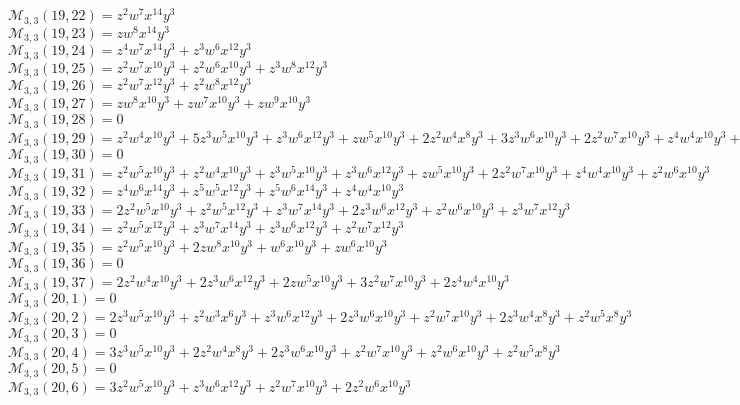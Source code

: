 \documentclass[12pt]{memoireuqam1.3}
\begin{document}
$\mathcal{M}_{3,3}(19,22)=z^2w^7x^{14}y^3$\\
$\mathcal{M}_{3,3}(19,23)=zw^8x^{14}y^3$\\
$\mathcal{M}_{3,3}(19,24)=z^4w^7x^{14}y^3+z^3w^6x^{12}y^3$\\
$\mathcal{M}_{3,3}(19,25)=z^2w^7x^{10}y^3+z^2w^6x^{10}y^3+z^3w^8x^{12}y^3$\\
$\mathcal{M}_{3,3}(19,26)=z^2w^7x^{12}y^3+z^2w^8x^{12}y^3$\\
$\mathcal{M}_{3,3}(19,27)=zw^8x^{10}y^3+zw^7x^{10}y^3+zw^9x^{10}y^3$\\
$\mathcal{M}_{3,3}(19,28)=0$\\
$\mathcal{M}_{3,3}(19,29)=z^2w^4x^{10}y^3+5z^3w^5x^{10}y^3+z^3w^6x^{12}y^3+zw^5x^{10}y^3+2z^2w^4x^8y^3+3z^3w^6x^{10}y^3+2z^2w^7x^{10}y^3+z^4w^4x^{10}y^3+z^2w^5x^8y^3$\\
$\mathcal{M}_{3,3}(19,30)=0$\\
$\mathcal{M}_{3,3}(19,31)=z^2w^5x^{10}y^3+z^2w^4x^{10}y^3+z^3w^5x^{10}y^3+z^3w^6x^{12}y^3+zw^5x^{10}y^3+2z^2w^7x^{10}y^3+z^4w^4x^{10}y^3+z^2w^6x^{10}y^3$\\
$\mathcal{M}_{3,3}(19,32)=z^4w^6x^{14}y^3+z^5w^5x^{12}y^3+z^5w^6x^{14}y^3+z^4w^4x^{10}y^3$\\
$\mathcal{M}_{3,3}(19,33)=2z^2w^5x^{10}y^3+z^2w^5x^{12}y^3+z^3w^7x^{14}y^3+2z^3w^6x^{12}y^3+z^2w^6x^{10}y^3+z^3w^7x^{12}y^3$\\
$\mathcal{M}_{3,3}(19,34)=z^2w^5x^{12}y^3+z^3w^7x^{14}y^3+z^3w^6x^{12}y^3+z^2w^7x^{12}y^3$\\
$\mathcal{M}_{3,3}(19,35)=z^2w^5x^{10}y^3+2zw^8x^{10}y^3+w^6x^{10}y^3+zw^6x^{10}y^3$\\
$\mathcal{M}_{3,3}(19,36)=0$\\
$\mathcal{M}_{3,3}(19,37)=2z^2w^4x^{10}y^3+2z^3w^6x^{12}y^3+2zw^5x^{10}y^3+3z^2w^7x^{10}y^3+2z^4w^4x^{10}y^3$\\
$\mathcal{M}_{3,3}(20,1)=0$\\
$\mathcal{M}_{3,3}(20,2)=2z^3w^5x^{10}y^3+z^2w^3x^6y^3+z^3w^6x^{12}y^3+2z^3w^6x^{10}y^3+z^2w^7x^{10}y^3+2z^3w^4x^8y^3+z^2w^5x^8y^3$\\
$\mathcal{M}_{3,3}(20,3)=0$\\
$\mathcal{M}_{3,3}(20,4)=3z^3w^5x^{10}y^3+2z^2w^4x^8y^3+2z^3w^6x^{10}y^3+z^2w^7x^{10}y^3+z^2w^6x^{10}y^3+z^2w^5x^8y^3$\\
$\mathcal{M}_{3,3}(20,5)=0$\\
$\mathcal{M}_{3,3}(20,6)=3z^2w^5x^{10}y^3+z^3w^6x^{12}y^3+z^2w^7x^{10}y^3+2z^2w^6x^{10}y^3$\\
\end{document}
